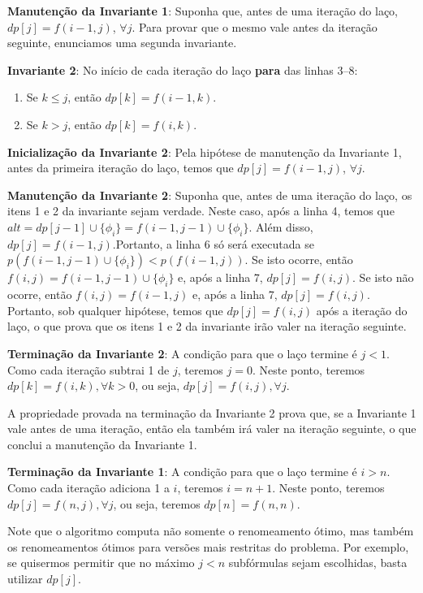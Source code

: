 \textbf{Manutenção da Invariante 1}: Suponha que, antes de uma iteração do laço,\break $dp[j] = f(i-1,j)$, $\forall j$. Para provar que o mesmo vale antes da iteração seguinte, enunciamos uma segunda invariante.

\textbf{Invariante 2}: No início de cada iteração do laço \textbf{para} das linhas 3--8:
\begin{enumerate}
	\item Se $k \leq j$, então $dp[k] = f(i-1,k)$.
	\item Se $k > j$, então $dp[k] = f(i,k)$.
\end{enumerate}

\textbf{Inicialização da Invariante 2}: Pela hipótese de manutenção da Invariante 1, antes da primeira iteração do laço, temos que $dp[j] = f(i-1,j)$, $\forall j$.

\textbf{Manutenção da Invariante 2}: Suponha que, antes de uma iteração do laço, os itens 1 e 2 da invariante sejam verdade. Neste caso, após a linha 4, temos que\break $alt = dp[j-1] \cup \{\phi_i \} = f(i-1,j-1) \cup \{\phi_i \}$. Além disso, $dp[j] = f(i-1,j)$.\break Portanto, a linha 6 só será executada se $p(f(i-1,j-1) \cup \{\phi_i \}) < p(f(i-1,j))$. Se isto ocorre, então $f(i,j) = f(i-1,j-1) \cup \{\phi_i \}$ e, após a linha 7, $dp[j] = f(i,j)$. Se isto não ocorre, então $f(i,j) = f(i-1,j)$ e, após a linha 7, $dp[j] = f(i,j)$. Portanto, sob qualquer hipótese, temos que $dp[j] = f(i,j)$ após a iteração do laço, o que prova que os itens 1 e 2 da invariante irão valer na iteração seguinte.

\textbf{Terminação da Invariante 2}: A condição para que o laço termine é $j < 1$. Como cada iteração subtrai 1 de $j$, teremos $j = 0$. Neste ponto, teremos $dp[k] = f(i,k), \forall k > 0$, ou seja, $dp[j] = f(i,j), \forall j$.

A propriedade provada na terminação da Invariante 2 prova que, se a Invariante 1 vale antes de uma iteração, então ela também irá valer na iteração seguinte, o que conclui a manutenção da Invariante 1.

\textbf{Terminação da Invariante 1}: A condição para que o laço termine é $i > n$. Como cada iteração adiciona 1 a $i$, teremos $i = n+1$. Neste ponto, teremos $dp[j] = f(n,j), \forall j$, ou seja, teremos $dp[n] = f(n,n)$.

Note que o algoritmo computa não somente o renomeamento ótimo, mas também os renomeamentos ótimos para versões mais restritas do problema. Por exemplo, se quisermos permitir que no máximo $j < n$ subfórmulas sejam escolhidas, basta utilizar $dp[j]$.

